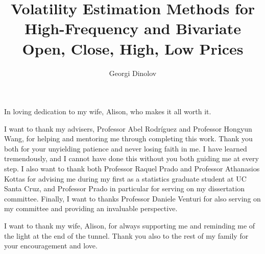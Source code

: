 

\def\newblock{\hskip .11em plus.33em minus.07em}



\title{Volatility Estimation Methods for High-Frequency and Bivariate
  Open, Close, High, Low Prices} \author{Georgi Dinolov}
  
 
\deanlinethree{}

\begin{frontmatter}
\maketitle

\copyrightpage

\tableofcontents

\listoffigures

\listoftables

\begin{abstract}

\end{abstract}

\begin{dedication}
\vspace*{\fill}
\begin{center}
  In loving dedication to my wife, Alison, who makes it all worth it.
\end{center}
\vspace*{\fill}
\end{dedication}

\begin{acknowledgements}
  I want to thank my advisers, Professor Abel Rodr\'iguez and
  Professor Hongyun Wang, for helping and mentoring me through
  completing this work. Thank you both for your unyielding patience
  and never losing faith in me. I have learned tremendously, and I
  cannot have done this without you both guiding me at every step. I
  also want to thank both Professor Raquel Prado and Professor
  Athanasios Kottas for advising me during my first as a statistics
  graduate student at UC Santa Cruz, and Professor Prado in particular
  for serving on my dissertation committee. Finally, I want to thanks
  Professor Daniele Venturi for also serving on my committee and
  providing an invaluable perspective.

  I want to thank my wife, Alison, for always supporting me and
  reminding me of the light at the end of the tunnel. Thank you also
  to the rest of my family for your encouragement and love.
\end{acknowledgements}

\end{frontmatter}

